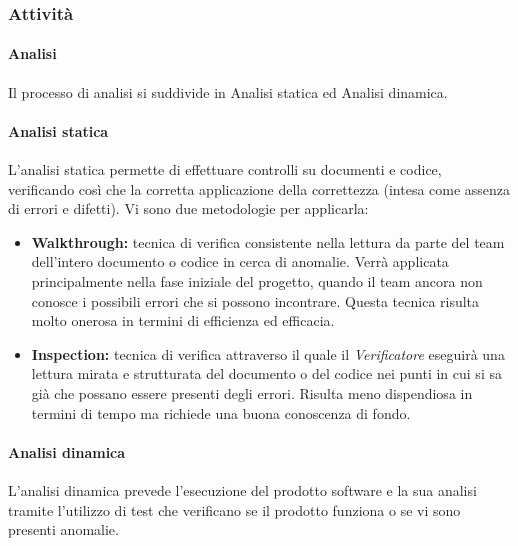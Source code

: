 \subsubsection{Attività}
\paragraph{Analisi}
\label{Analisi}
Il processo di analisi si suddivide in Analisi statica ed Analisi dinamica.
\paragraph{Analisi statica}
L'analisi statica permette di effettuare controlli su documenti e codice, verificando così che la corretta applicazione della correttezza (intesa come assenza di errori e difetti). Vi sono due metodologie per applicarla:
\begin{itemize}
	\item \textbf{Walkthrough:} tecnica di verifica consistente nella lettura da parte del team dell'intero documento o codice in cerca di anomalie. Verrà applicata principalmente nella fase iniziale del progetto, quando il team ancora non conosce i possibili errori che si possono incontrare. Questa tecnica risulta molto onerosa in termini di efficienza ed efficacia.
	\item \textbf{Inspection:} tecnica di verifica attraverso il quale il \textit{Verificatore} eseguirà una lettura mirata e strutturata del documento o del codice nei punti in cui si sa già che possano essere presenti degli errori. Risulta meno dispendiosa in termini di tempo ma richiede una buona conoscenza di fondo.
\end{itemize}
\paragraph{Analisi dinamica}
L'analisi dinamica prevede l'esecuzione del prodotto software e la sua analisi tramite l'utilizzo di test che verificano se il prodotto funziona o se vi sono presenti anomalie.
